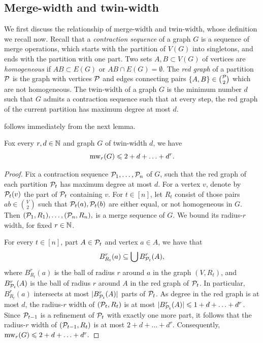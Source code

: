 \subsection{Merge-width and twin-width}\label{sec:tww}
We first discuss the relationship of merge-width and twin-width,
whose definition we recall now.
Recall that a \emph{contraction sequence} of a graph $G$ is a sequence of merge operations, which starts with the partition of $V(G)$ into singletons, and ends with the partition with one part.
Two sets $A,B\subset V(G)$ of vertices are \emph{homogeneous} if $AB\subset E(G)$ or $AB\cap E(G)=\emptyset$.
The \emph{red graph} of a partition $\cal P$
is the graph with vertices $\cal P$ and edges connecting pairs $\set{A,B}\in{\cal P\choose 2}$ 
which are not homogeneous. The twin-width of a graph $G$ is the minimum number $d$ 
such that $G$ admits a contraction sequence such that at every step, the red graph of the current partition has maximum degree at most $d$.


\twwintro*
 follows immediately from the next lemma.
\begin{lemma}\label{lem:tww}
  Fox every $r,d\in \N$ and graph $G$ of twin-width $d$, we have 
  $$\mw_r(G)\le 2+d+\ldots+d^r.$$
\end{lemma}
\begin{proof}
Fix a contraction sequence $\cal P_1,\ldots,\cal P_n$ of $G$, such that
the red graph of each partition $\cal P_t$ has maximum degree at most $d$.
For a vertex \(v\), denote by \(\cal P_t(v)\) the part of \(\cal P_t\) containing \(v\).
For $t\in[n]$, let $R_t$ consist of those pairs $ab\in {V\choose 2}$ such that $\cal P_t(a),\cal P_t(b)$ are either equal, or not homogeneous in $G$.
Then 
  $(\cal P_1,R_1),\ldots,(\cal P_n,R_n),$
  is a merge sequence of $G$. We bound its radius-$r$ width, for fixed $r\in\N$.

  For every $t\in[n]$, part $A\in\cal P_t$ and vertex $a\in A$, 
  we have that 
  \begin{align}\label{eq:tww-mw}
  B^r_{R_t}(a)\subset \bigcup B^r_{\cal P_t}(A),  
  \end{align}
  where $B^r_{R_t}(a)$ is the ball of radius $r$ around $a$ in the graph $(V,R_t)$, 
  and $B^r_{\cal P_t}(A)$ is the ball of radius $r$ around $A$ in the red graph of $\cal P_t$.
  In particular, $B^r_{R_t}(a)$ intersects at most $|B^r_{\cal P_t}(A)|$ parts of $\cal P_t$.
  As degree in the red graph is at most \(d\), the radius-$r$ width of $(\cal P_t,R_t)$ is at most $|B^r_{\cal P_t}(A)|\le 1+d+\ldots+d^r$.
  Since $\cal P_{t-1}$ is a refinement of $\cal P_t$ with exactly one more part,
  it follows that 
  the radius-$r$ width of $(\cal P_{t-1},R_t)$ is at most $2+d+\ldots+d^r$.
Consequently,
$\mw_r(G)\le 2+d+\ldots+d^r.$
\end{proof}

